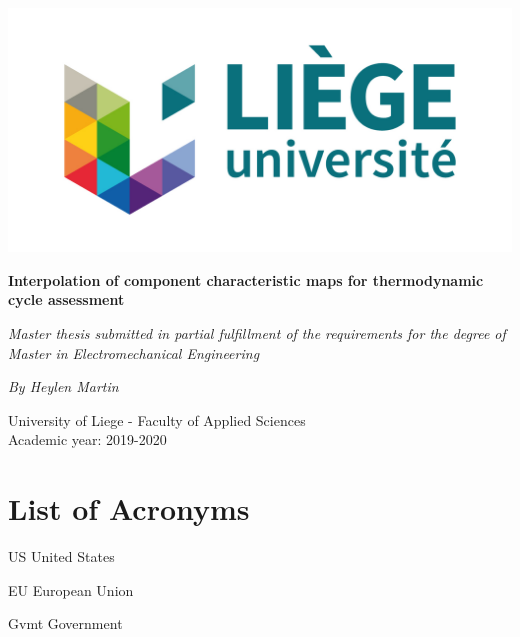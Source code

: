 \documentclass[12pt,a4paper]{report}
\makeatletter
\newcommand{\tocfill}{\cleaders\hbox{$\m@th \mkern\@dotsep mu . \mkern\@dotsep mu$}\hfill}
\newcommand{\abbrlabel}[1]{\makebox[3cm][l]{\textbf{#1}\ \tocfill}}
\newenvironment{abbreviations}{\begin{list}{}{\renewcommand{\makelabel}{\abbrlabel}%
                                              \setlength{\itemsep}{0pt}}}{\end{list}}
\makeatother
\begin{document}
\begin{titlepage}

\centering
\includegraphics{logo_ulg.jpg}%

\vspace*{1cm}
\hrulefill
\begin{center}\bfseries\Huge
Interpolation of component characteristic maps for thermodynamic cycle assessment
\end{center}
\hrulefill
\vspace*{0.2cm}
\begin{center}\Large
\textit{Master thesis submitted in partial fulfillment of the requirements
for the degree of Master in Electromechanical Engineering}
\end{center}
\begin{center}\Large
\textit{By Heylen Martin}
\end{center}
\vspace*{0.2cm}

\begin{center}\bfseries\large

University of Liege - Faculty of Applied Sciences \\
Academic year: 2019-2020
\end{center}
\begin{flushright}

\end{flushright} 

\end{titlepage}


\tableofcontents
\listoffigures
\listoftables
\newpage
\chapter*{List of Acronyms}
\begin{abbreviations}
\item[US] United States
\item[EU] European Union
\item[Gvmt] Government
\end{abbreviations}
\end{document}
